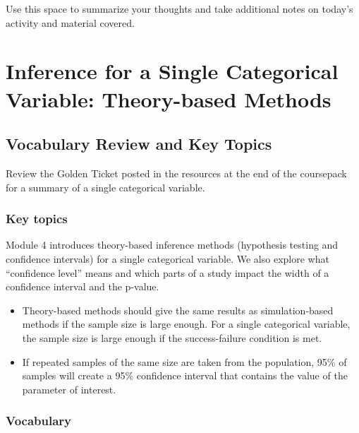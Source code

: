 \documentclass[
]{report}
\begin{document}
Use this space to summarize your thoughts and take additional notes on today's activity and material covered.

\newpage

\chapter{Inference for a Single Categorical Variable: Theory-based Methods}\label{inference-for-a-single-categorical-variable-theory-based-methods}

\section{Vocabulary Review and Key Topics}\label{vocabulary-review-and-key-topics-3}

Review the Golden Ticket posted in the resources at the end of the coursepack for a summary of a single categorical variable.

\subsection{Key topics}\label{key-topics-3}

Module 4 introduces theory-based inference methods (hypothesis testing and confidence intervals) for a single categorical variable. We also explore what ``confidence level'' means and which parts of a study impact the width of a confidence interval and the p-value.

\begin{itemize}
\item
  Theory-based methods should give the same results as simulation-based methods if the sample size is large enough. For a single categorical variable, the sample size is large enough if the success-failure condition is met.
\item
  If repeated samples of the same size are taken from the population, 95\% of samples will create a 95\% confidence interval that contains the value of the parameter of interest.
\end{itemize}

\subsection{Vocabulary}\label{vocabulary-3}
\end{document}
